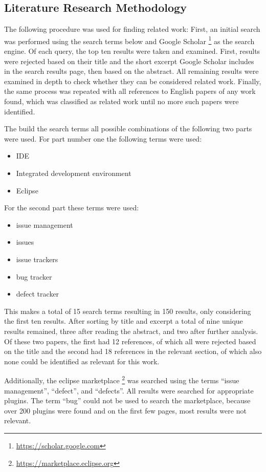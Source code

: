 \subsection{Literature Research Methodology} 
\label{ssec:ch2:ss2.1}
The following procedure was used for finding related work:
First, an initial search was performed using the search terms below and Google Scholar \footnote{\url{https://scholar.google.com}} as the search engine.
Of each query, the top ten results were taken and examined.
First, results were rejected based on their title and the short excerpt Google Scholar includes in the search results page, 
then based on the abstract.
All remaining results were examined in depth to check whether they can be considered related work.
Finally, the same process was repeated with all references to English papers of any work found, 
which was classified as related work until no more such papers were identified.

The build the search terms all possible combinations of the following two parts were used.
For part number one the following terms were used:
\begin{itemize}
	\item IDE
	\item Integrated development environment
	\item Eclipse
\end{itemize}

For the second part these terms were used:

\begin{itemize}
	\item issue management
	\item issues
	\item issue trackers
	\item bug tracker
	\item defect tracker
\end{itemize}

This makes a total of 15 search terms resulting in 150 results, only considering the first ten results.
After sorting by title and excerpt a total of nine unique results remained, three after reading the abstract, and two after further analysis.
Of these two papers, the first had 12 references, of which all were rejected based on the title and the second had 18 references in the relevant section, of which also none could be identified as relevant for this work.

Additionally, the eclipse marketplace \footnote{\url{https://marketplace.eclipse.org}} was searched using the terms ``issue management'', ``defect'', and ``defects''. 
All results were searched for appropriate plugins.
The term ``bug'' could not be used to search the marketplace, because over 200 plugins were found and on the first few pages, most results were not relevant.

